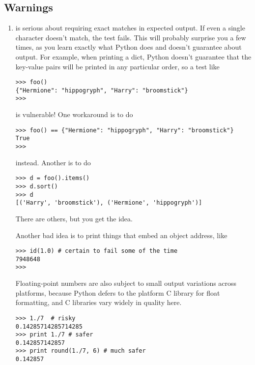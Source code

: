 \subsection{Warnings}

\begin{enumerate}

\item {} is serious about requiring exact matches in expected
  output.  If even a single character doesn't match, the test fails.  This
  will probably surprise you a few times, as you learn exactly what Python
  does and doesn't guarantee about output.  For example, when printing a
  dict, Python doesn't guarantee that the key-value pairs will be printed
  in any particular order, so a test like

\begin{verbatim}
>>> foo()
{"Hermione": "hippogryph", "Harry": "broomstick"}
>>>
\end{verbatim}

is vulnerable!  One workaround is to do

\begin{verbatim}
>>> foo() == {"Hermione": "hippogryph", "Harry": "broomstick"}
True
>>>
\end{verbatim}

instead.  Another is to do

\begin{verbatim}
>>> d = foo().items()
>>> d.sort()
>>> d
[('Harry', 'broomstick'), ('Hermione', 'hippogryph')]
\end{verbatim}

There are others, but you get the idea.

Another bad idea is to print things that embed an object address, like

\begin{verbatim}
>>> id(1.0) # certain to fail some of the time
7948648
>>>
\end{verbatim}

Floating-point numbers are also subject to small output variations across
platforms, because Python defers to the platform C library for float
formatting, and C libraries vary widely in quality here.

\begin{verbatim}
>>> 1./7  # risky
0.14285714285714285
>>> print 1./7 # safer
0.142857142857
>>> print round(1./7, 6) # much safer
0.142857
\end{verbatim}


\end{enumerate}
